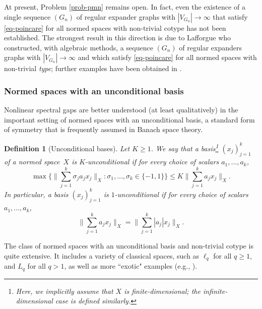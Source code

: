 \documentclass[11pt,leqno]{amsart}
\newtheorem{definition}[theorem]{Definition}
\theoremstyle{remark}
\theoremstyle{plain}
\begin{document}
At present, Problem \ref{prob-pmn} remains open. In fact, even the existence of a single sequence $(G_n)$
of regular expander graphs with $|V_{G_n}|\to\infty$ that satisfy \eqref{eq-poincare}
for all normed spaces with non-trivial cotype has not been established. The strongest result in this direction is due
to Lafforgue \cite{La08} who constructed, with algebraic methods, a sequence $(G_n)$
of regular expanders graphs with $|V_{G_n}|\to\infty$ and which satisfy \eqref{eq-poincare}
for all normed spaces with non-trivial {\it type}; further examples have been obtained in \cite{MN14,dLdS23}.

\subsubsection{Normed spaces with an unconditional basis}

Nonlinear spectral gaps are better understood (at least qualitatively) in the important setting of normed spaces with an unconditional basis, a standard form of symmetry that is frequently assumed in Banach space theory.
\begin{definition}[Unconditional bases]
Let $K\geqslant 1$. We say that a basis\footnote{Here, we implicitly assume that $X$ is finite-dimensional;
the infinite-dimensional case is defined similarly.} $(x_j)_{j=1}^k$ of a normed space~$X$ is \emph{$K$-unconditional}
if for every choice of scalars $a_1,\dots,a_k$,
\[ \max\bigg\{ \Big\|\sum_{j=1}^k \sigma_j a_j x_j \Big\|_X \colon \sigma_1,\dots,\sigma_k\in \{-1,1\}\bigg\}
\leqslant K \bigg\| \sum_{j=1}^k a_j x_j\bigg\|_X. \]
In particular, a basis $(x_j)_{j=1}^k$ is $1$-unconditional if for every choice of scalars $a_1,\dots,a_k$,
$$ \bigg\|\sum_{j=1}^k a_j x_j\bigg\|_X =\bigg\|\sum_{j=1}^k |a_j| x_j\bigg\|_X. $$
\end{definition}
The class of normed spaces with an unconditional basis and non-trivial cotype is quite extensive. It includes a variety of classical spaces, such as $\ell_q$ for all $q\geqslant 1$, and $L_q$ for all $q>1$, as well as more ``exotic" examples (e.g., \cite{FJ74}).
\end{document}

